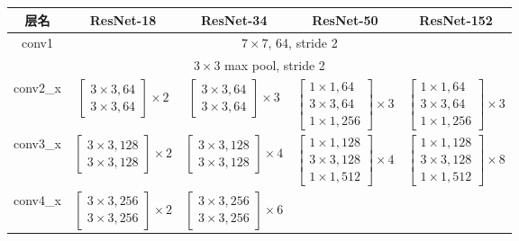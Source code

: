 \begin{center}
\begin{tabular}{c|cccc}
\toprule
\textbf{层名} & \textbf{ResNet-18} & \textbf{ResNet-34} & \textbf{ResNet-50} & \textbf{ResNet-152} \\
\midrule
conv1 & \multicolumn{4}{c}{$7\times7$, 64, stride 2} \\
\multicolumn{5}{c}{$3\times3$ max pool, stride 2} \\
\midrule
conv2\_x & $\begin{bmatrix}3\times3,64\\3\times3,64\end{bmatrix}\times 2$ &
$\begin{bmatrix}3\times3,64\\3\times3,64\end{bmatrix}\times 3$ &
$\begin{bmatrix}1\times1,64\\3\times3,64\\1\times1,256\end{bmatrix}\times 3$ &
$\begin{bmatrix}1\times1,64\\3\times3,64\\1\times1,256\end{bmatrix}\times 3$ \\[8pt]
conv3\_x & $\begin{bmatrix}3\times3,128\\3\times3,128\end{bmatrix}\times 2$ &
$\begin{bmatrix}3\times3,128\\3\times3,128\end{bmatrix}\times 4$ &
$\begin{bmatrix}1\times1,128\\3\times3,128\\1\times1,512\end{bmatrix}\times 4$ &
$\begin{bmatrix}1\times1,128\\3\times3,128\\1\times1,512\end{bmatrix}\times 8$ \\[8pt]
conv4\_x & $\begin{bmatrix}3\times3,256\\3\times3,256\end{bmatrix}\times 2$ &
$\begin{bmatrix}3\times3,256\\3\times3,256\end{bmatrix}\times 6$ &

\end{tabular}
\end{center}
